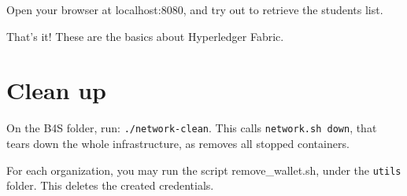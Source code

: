 \documentclass[12pt,a4paper]{article}
\theoremstyle{definition}
\begin{document}
Open your browser at localhost:8080, and try out to retrieve the students list.

That's it! These are the basics about Hyperledger Fabric. 




\section{Clean up}
On the B4S folder, run: \texttt{./network-clean}. This calls \texttt{network.sh down}, that tears down the whole infrastructure, as removes all stopped containers.

For each organization, you may run the script remove\_wallet.sh, under the \texttt{utils} folder. This deletes the created credentials. 









\end{document}
